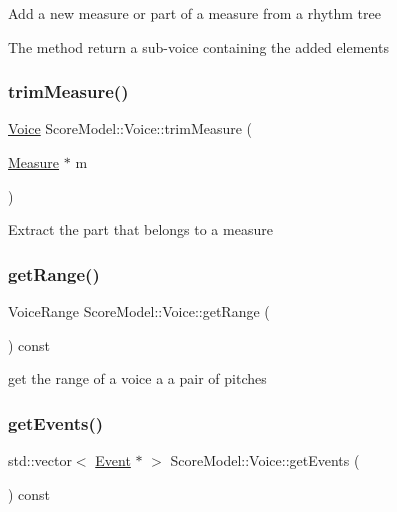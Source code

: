 Add a new measure or part of a measure from a rhythm tree

The method return a sub-\/voice containing the added elements \mbox{\label{classScoreModel_1_1Voice_ad0027fbbd10c314a08385f3030fae13d}} 
\subsubsection{\texorpdfstring{trimMeasure()}{trimMeasure()}}
{\footnotesize\ttfamily \mbox{\hyperlink{classScoreModel_1_1Voice}{Voice}} Score\+Model\+::\+Voice\+::trim\+Measure (\begin{DoxyParamCaption}\item[{\mbox{\hyperlink{classScoreModel_1_1Measure}{Measure}} $\ast$}]{m }\end{DoxyParamCaption})}

Extract the part that belongs to a measure \mbox{\label{classScoreModel_1_1Voice_a2249c4f4152e849683b32727cd2c3371}} 
\subsubsection{\texorpdfstring{getRange()}{getRange()}}
{\footnotesize\ttfamily Voice\+Range Score\+Model\+::\+Voice\+::get\+Range (\begin{DoxyParamCaption}{ }\end{DoxyParamCaption}) const}

get the range of a voice a a pair of pitches \mbox{\label{classScoreModel_1_1Voice_acbbfa1e87da6dfd568150f5a18067dd1}} 
\subsubsection{\texorpdfstring{getEvents()}{getEvents()}}
{\footnotesize\ttfamily std\+::vector$<$ \mbox{\hyperlink{classScoreModel_1_1Event}{Event}} $\ast$ $>$ Score\+Model\+::\+Voice\+::get\+Events (\begin{DoxyParamCaption}{ }\end{DoxyParamCaption}) const}

